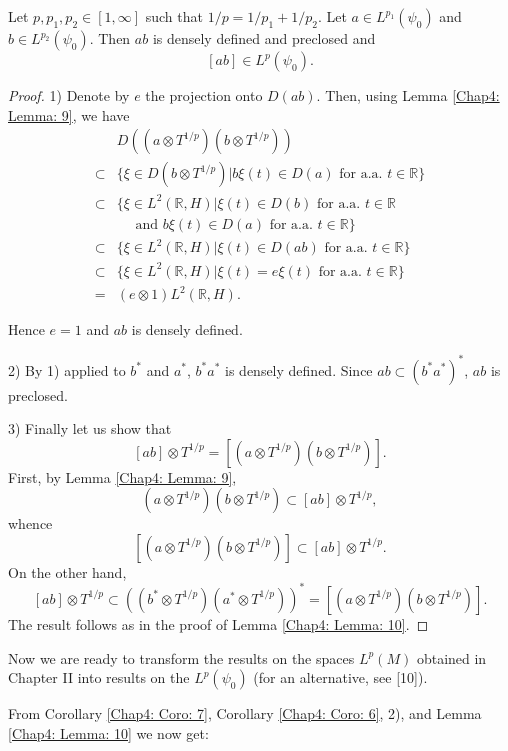 \begin{lemma}
    Let $p,p_1,p_2\in [1,\infty]$ such that $1/p = 1/p_1 + 1/p_2$. Let $a\in L^{p_1}(\psi_0)$ and $b \in L^{p_2}(\psi_0)$. Then $ab$ is densely defined and preclosed and
    \[
        [ab]\in L^p(\psi_0).
    \]
\end{lemma}
\begin{proof}
    1) Denote by $e$ the projection onto $D(ab)$. Then, using Lemma \ref{Chap4: Lemma: 9}, we have
    \[
        \begin{split}
            &D((a\otimes T^{1/p})(b\otimes T^{1/p}))\\
            \subset& \{\xi\in D(b\otimes T^{1/p})|b\xi(t)\in D(a) \text{ for a.a. }t\in \mathbb{R}\}\\
            \subset& \{\xi\in L^2(\mathbb{R},H)|\xi(t)\in D(b) \text{ for a.a. }t\in \mathbb{R}\\
            &\quad \text{ and } b\xi(t)\in D(a) \text{ for a.a. }t\in \mathbb{R}\}\\
            \subset& \{\xi\in L^2(\mathbb{R},H)|\xi(t)\in D(ab) \text{ for a.a. }t\in \mathbb{R}\}\\
            \subset& \{\xi\in L^2(\mathbb{R},H)|\xi(t)=e\xi(t) \text{ for a.a. }t\in \mathbb{R}\}\\
            =&(e\otimes 1)L^2(\mathbb{R},H).
        \end{split}
    \]

    Hence $e = 1$ and $ab$ is densely defined. \par
    2) By 1) applied to $b^*$ and $a^*$, $b^*a^*$ is densely defined. Since $ab\subset (b^*a^*)^*$, $ab$ is preclosed.\par
    3) Finally let us show that
    \[
        [ab]\otimes T^{1/p}=[(a\otimes T^{1/p})(b\otimes T^{1/p})].
    \]
    First, by Lemma \ref{Chap4: Lemma: 9},
    \[
        (a\otimes T^{1/p})(b\otimes T^{1/p})\subset [ab]\otimes T^{1/p},
    \]
    whence
    \[
        [(a\otimes T^{1/p})(b\otimes T^{1/p})] \subset [ab]\otimes T^{1/p}.
    \]
    On the other hand,
    \[
        [ab]\otimes T^{1/p}\subset ((b^*\otimes T^{1/p})(a^*\otimes T^{1/p}))^*=[(a\otimes T^{1/p})(b\otimes T^{1/p})].
    \]
    The result follows as in the proof of Lemma \ref{Chap4: Lemma: 10}.
\end{proof}
Now we are ready to transform the results on the spaces $L^p(M)$ obtained in Chapter II into results on the $L^p(\psi_0)$ (for an alternative, see [10]). \par
From Corollary \ref{Chap4: Coro: 7}, Corollary \ref{Chap4: Coro: 6}, 2), and Lemma \ref{Chap4: Lemma: 10} we now get:
